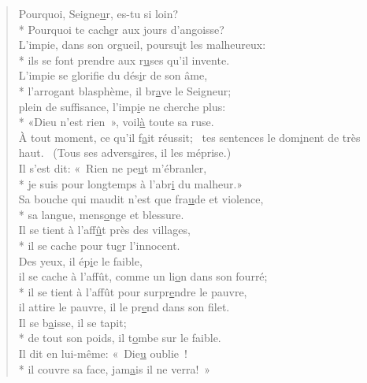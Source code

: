\begin{verse}
Pourquoi, Seigne\underline{u}r, es-tu si loin? \\*
Pourquoi te cach\underline{e}r aux jours d’angoisse? \\
L’impie, dans son orgueil, poursu\underline{i}t les malheureux: \\*
ils se font prendre aux r\underline{u}ses qu’il invente. \\

L’impie se glorifie du dés\underline{i}r de son âme, \\*
l’arrogant blasphème, il br\underline{a}ve le Seigneur; \\
plein de suffisance, l’imp\underline{i}e ne cherche plus: \\*
«Dieu n’est rien », voil\underline{à} toute sa ruse. \\

À tout moment, ce qu’il f\underline{a}it réussit;~\psalmdagger
tes sentences le dom\underline{i}nent de très haut.~\psalmstar
(Tous ses advers\underline{a}ires, il les méprise.) \\
Il s’est dit: « Rien ne pe\underline{u}t m’ébranler, \\*
je suis pour longtemps à l’abr\underline{i} du malheur.» \\

Sa bouche qui maudit n’est que fra\underline{u}de et violence, \\*
sa langue, mens\underline{o}nge et blessure. \\
Il se tient à l’aff\underline{û}t près des villages, \\*
il se cache pour tu\underline{e}r l’innocent. \\

Des yeux, il ép\underline{i}e le faible, \\
il se cache à l’affût, comme un li\underline{o}n dans son fourré; \\*
il se tient à l’affût pour surpr\underline{e}ndre le pauvre, \\
il attire le pauvre, il le pr\underline{e}nd dans son filet. \\

Il se b\underline{a}isse, il se tapit; \\*
de tout son poids, il t\underline{o}mbe sur le faible. \\
Il dit en lui-même: « Die\underline{u} oublie ! \\*
il couvre sa face, jam\underline{a}is il ne verra! » \\


\end{verse}
